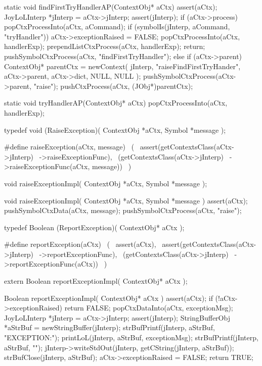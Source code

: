 \startCCode
static void findFirstTryHandlerAP(ContextObj* aCtx) {
  assert(aCtx);
  JoyLoLInterp *jInterp = aCtx->jInterp;
  assert(jInterp);
  if (aCtx->process) {
    popCtxProcessInto(aCtx, aCommand);
    if (symbolIs(jInterp, aCommand, "tryHandler")) {
      aCtx->exceptionRaised = FALSE;
      popCtxProcessInto(aCtx, handlerExp);
      prependListCtxProcess(aCtx, handlerExp);
      return;
    }
    pushSymbolCtxProcess(aCtx, "findFirstTryHandler");
  } else {
    if (aCtx->parent) {
      ContextObj* parentCtx = newContext(
        jInterp,
        "raiseFindFirstTryHander",
        aCtx->parent,
        aCtx->dict,
        NULL,
        NULL
      );
      pushSymbolCtxProcess(aCtx->parent, "raise");
      pushCtxProcess(aCtx, (JObj*)parentCtx);
    }
  }
}
\stopCCode

\startCCode
static void tryHandlerAP(ContextObj* aCtx) {
  popCtxProcessInto(aCtx, handlerExp);
}
\stopCCode

\startCHeader
typedef void (RaiseException)(
  ContextObj *aCtx,
  Symbol     *message
);

#define raiseException(aCtx, message)       \
  (                                         \
    assert(getContextsClass(aCtx->jInterp)  \
      ->raiseExceptionFunc),                \
    (getContextsClass(aCtx->jInterp)        \
      ->raiseExceptionFunc(aCtx, message))  \
  )
\stopCHeader

\setCHeaderStream{private}
\startCHeader
void raiseExceptionImpl(
  ContextObj *aCtx,
  Symbol     *message
);
\stopCHeader
{}

\startCCode
void raiseExceptionImpl(
  ContextObj *aCtx,
  Symbol     *message
) {
  assert(aCtx);
  pushSymbolCtxData(aCtx, message);
  pushSymbolCtxProcess(aCtx, "raise");
}
\stopCCode

\startCHeader
typedef Boolean (ReportException)(
  ContextObj* aCtx
);

#define reportException(aCtx)               \
  (                                         \
    assert(aCtx),                           \
    assert(getContextsClass(aCtx->jInterp)  \
      ->reportExceptionFunc),               \
    (getContextsClass(aCtx->jInterp)        \
      ->reportExceptionFunc(aCtx))          \
  )
\stopCHeader

\startCHeader
extern Boolean reportExceptionImpl(
  ContextObj* aCtx
);
\stopCHeader
\setCHeaderStream{public}

\startCCode
Boolean reportExceptionImpl(
  ContextObj* aCtx
) {
  assert(aCtx);
  if (!aCtx->exceptionRaised) return FALSE;
  popCtxDataInto(aCtx, exceptionMsg);
  JoyLoLInterp *jInterp = aCtx->jInterp;
  assert(jInterp);
  StringBufferObj *aStrBuf = 
    newStringBuffer(jInterp);
  strBufPrintf(jInterp, aStrBuf, "\nUNHANDLED EXCEPTION:\n");
  printLoL(jInterp, aStrBuf, exceptionMsg);
  strBufPrintf(jInterp, aStrBuf, "\n");
  jInterp->writeStdOut(jInterp, getCString(jInterp, aStrBuf));
  strBufClose(jInterp, aStrBuf);
  aCtx->exceptionRaised = FALSE;
  return TRUE;
}
\stopCCode

